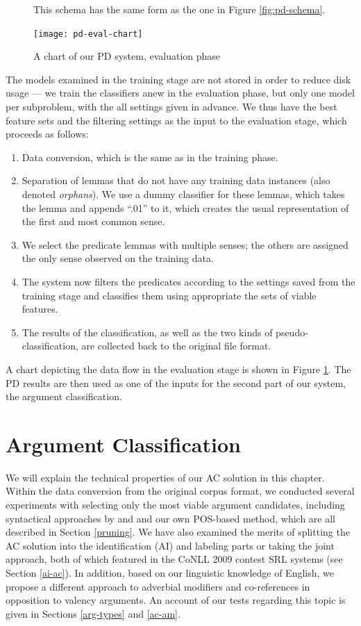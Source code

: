 \documentclass[12pt,notitlepage]{report}
\begin{document}
\begin{figure}[htb]
\caption{A chart of our PD system, evaluation phase}\label{fig:pd-eval}
\noindent\footnotesize This schema has the same form as the one in Figure \ref{fig:pd-schema}.
\begin{center}
\texttt{[image: pd-eval-chart]}
\end{center}
\end{figure}

The models examined in the training stage are not stored in order to reduce disk usage --- we train the classifiers anew in the evaluation phase, but only one model per subproblem, with the all settings given in advance. We thus have the best feature sets and the filtering settings as the input to the evaluation stage, which proceeds as follows:
\begin{enumerate}
    \item Data conversion, which is the same as in the training phase.
    \item Separation of lemmas that do not have any training data instances (also denoted \emph{orphans}). We use a dummy classifier for these lemmas, which takes the lemma and appends ``.01'' to it, which creates the usual representation of the first and most common sense.
    \item We select the predicate lemmas with multiple senses; the others are assigned the only sense observed on the training data.
    \item The system now filters the predicates according to the settings saved from the training stage and classifies them using appropriate the sets of viable features.
    \item The results of the classification, as well as the two kinds of pseudo-classification, are collected back to the original file format.
\end{enumerate}
A chart depicting the data flow in the evaluation stage is shown in Figure \ref{fig:pd-eval}. The PD results are then used as one of the inputs for the second part of our system, the argument classification.

%
%
\chapter{Argument Classification}\label{ac}
%
%

We will explain the technical properties of our AC solution in this chapter. Within the data conversion from the original corpus format, we conducted several experiments with selecting only the most viable argument candidates, including syntactical approaches by \citet{zhao09} and \citet{asahara09} and our own POS-based method, which are all described in Section \ref{pruning}. We have also examined the merits of splitting the AC solution into the identification (AI) and labeling parts or taking the joint approach, both of which featured in the CoNLL 2009 contest SRL systems (see Section \ref{ai-ac}). In addition, based on our linguistic knowledge of English, we propose a different approach to adverbial modifiers and co-references in opposition to valency arguments. An account of our tests regarding this topic is given in Sections \ref{arg-types} and \ref{ac-am}. 
\end{document}
